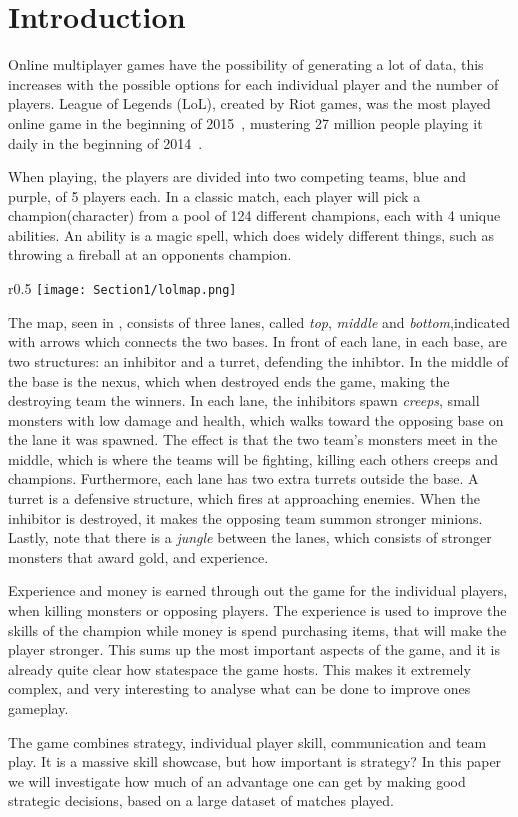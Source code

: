 \section{Introduction}\label{sec:intro}

Online multiplayer games have the possibility of generating a lot of data, this increases with the possible options for each individual player and the number of players. 
League of Legends (LoL), created by Riot games, was the most played online game in the beginning of 2015~\cite{LoLmostplayed}, mustering 27 million people playing it daily in the beginning of 2014~\cite{LoL27mill}. 

When playing, the players are divided into two competing teams, blue and purple, of 5 players each. In a classic match, each player will pick a champion(character) from a pool of 124 different champions, each with 4 unique abilities. An ability is a magic spell, which does widely different things, such as throwing a fireball at an opponents champion.

\begin{wrapfigure}{r}{{0.5\textwidth}} %
  \centering
    \texttt{[image: Section1/lolmap.png]}
  \caption{League of legends map}\label{fig:lolmap}
\end{wrapfigure}
The map, seen in , consists of three lanes, called \emph{top}, \emph{middle} and \emph{bottom},indicated with arrows which connects the two bases. In front of each lane, in each base, are two structures: an inhibitor and a turret, defending the inhibtor. In the middle of the base is the nexus, which when destroyed ends the game, making the destroying team the winners. In each lane, the inhibitors spawn \emph{creeps}, small monsters with low damage and health, which walks toward the opposing base on the lane it was spawned. The effect is that the two team's monsters meet in the middle, which is where the teams will be fighting, killing each others creeps and champions. Furthermore, each lane has two extra turrets outside the base. A turret is a defensive structure, which fires at approaching enemies. When the inhibitor is destroyed, it makes the opposing team summon stronger minions. Lastly, note that there is a \emph{jungle} between the lanes, which consists of stronger monsters that award gold, and experience.

Experience and money is earned through out the game for the individual players, when killing monsters or opposing players. The experience is used to improve the skills of the champion while money is spend purchasing items, that will make the player stronger. This sums up the most important aspects of the game, and it is already quite clear how statespace the game hosts. This makes it extremely complex, and very interesting to analyse what can be done to improve ones gameplay. 

The game combines strategy, individual player skill, communication and team play. It is a massive skill showcase, but how important is strategy? In this paper we will investigate how much of an advantage one can get by making good strategic decisions, based on a large dataset of matches played.


